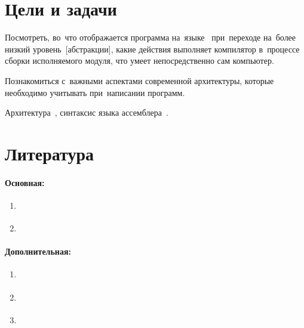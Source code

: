
\section{Цели и задачи}
Посмотреть, во~что отображается программа на~языке~ при~переходе на~более низкий уровень~[абстракции], какие действия выполняет компилятор в~процессе сборки исполняемого модуля, что умеет непосредственно сам компьютер.

Познакомиться с~важными аспектами современной архитектуры, которые необходимо учитывать при~написании программ.

Архитектура \,, синтаксис языка ассемблера~.



\section{Литература}

\paragraph{Основная:}
\begin{enumerate}
  \item \cite{Harris:2015:ru}
  \item \cite{Bryant:2022:ru}
\end{enumerate}



\paragraph{Дополнительная:}
\begin{enumerate}[resume]
  \item \cite{Tanenbaum:2013:ru}
  \item \cite{Vorozhcov:2008:ru}
  \item \cite{Pacheco:2011:en}
\end{enumerate}
\nocite{WikiBookAsm:ru, Zubkov:2000:ru}



